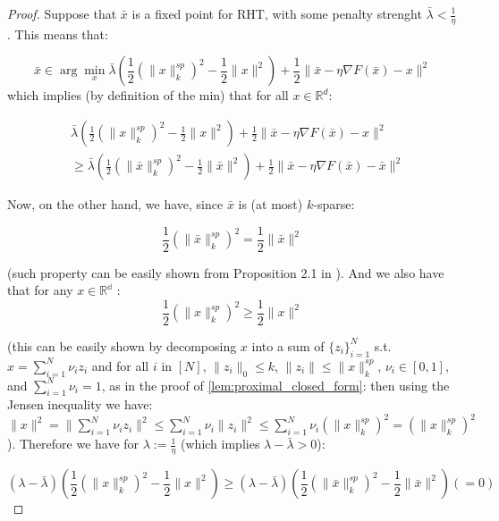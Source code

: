 \documentclass{article}
\begin{document}
\begin{proof}
    
Suppose that $\bar{x}$ is a fixed point for RHT, with some penalty strenght $\bar{\lambda} < \frac{1}{\eta}$. This means that:

\begin{equation*}
    \bar{x} \in \arg\min_{x} \bar{\lambda}  \left(\frac{1}{2} \left(\| x\|^{sp}_k\right)^2 - \frac{1}{2} \|x\|^2 \right)+ \frac{1}{2} \|\bar{x} - \eta \nabla F(\bar{x}) - x \|^2 
\end{equation*}
which implies (by definition of the min) that for all $x \in \mathbb{R}^d$: 

\begin{align}
     &\bar{\lambda}  \left(\frac{1}{2} \left(\| x\|^{sp}_k\right)^2 - \frac{1}{2} \|x\|^2 \right)+ \frac{1}{2} \|\bar{x} - \eta \nabla F(\bar{x}) - x \|^2 \nonumber\\
     &\geq  \bar{\lambda} \left(\frac{1}{2} \left(\| \bar{x}\|^{sp}_k\right)^2 - \frac{1}{2} \|\bar{x}\|^2 \right)+ \frac{1}{2} \|\bar{x} - \eta \nabla F(\bar{x}) - \bar{x} \|^2 \label{eq:toadd1}
\end{align}

Now, on the other hand, we have, since $\bar{x}$ is (at most) $k$-sparse: 

$$\frac{1}{2} \left(\| \bar{x}\|^{sp}_k\right)^2 = \frac{1}{2} \|\bar{x}\|^2 $$


(such property can be easily shown from Proposition 2.1 in \cite{argyriou2012sparse}). And we also have that for any $x \in \mathbb{R^d}$ :
$$\frac{1}{2} \left(\|x\|^{sp}_k\right)^2 \geq  \frac{1}{2} \|x\|^2 $$

(this can be easily shown by decomposing $x$ into a sum of $\{z_i\}_{i=1}^N$ s.t. $x = \sum_{i=1}^N \nu_i z_i $ and for all $i$ in $[N]$,  $\|z_i \|_0 \leq k$, $\| z_i\| \leq \| x \|_{k}^{sp}$, $\nu_i \in [0, 1]$, and $\sum_{i=1}^N \nu_i = 1$, as in the proof of \ref{lem:proximal_closed_form}: then using the Jensen inequality we have: $\|x\|^2 = \|\sum_{i=1}^N \nu_i z_i \|^2 \leq \sum_{i=1}^N \nu_i \| z_i \|^2 \leq \sum_{i=1}^N \nu_i \left(\| x \|_{k}^{sp}\right)^2 =  \left(\| x \|_{k}^{sp}\right)^2$). Therefore we have for $\lambda := \frac{1}{\eta}$ (which implies $\lambda - \bar{\lambda} > 0$):

\begin{equation}\label{eq:toadd2}
   (\lambda - \bar{\lambda}) \left( \frac{1}{2} \left(\| x\|^{sp}_k\right)^2 - \frac{1}{2} \|x\|^2 \right) \geq   (\lambda - \bar{\lambda}) \left( \frac{1}{2} \left(\| \bar{x}\|^{sp}_k\right)^2 - \frac{1}{2} \|\bar{x}\|^2 \right) (= 0)
\end{equation}


\end{proof}
\end{document}
